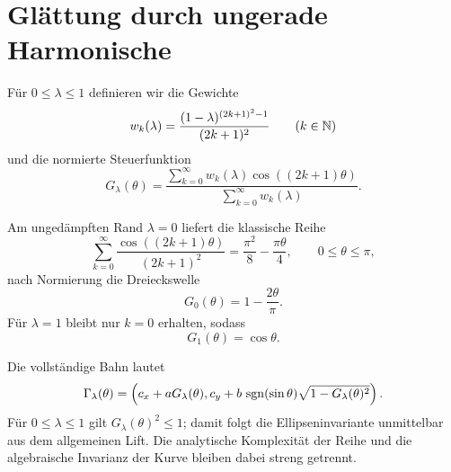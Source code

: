 \section{Glättung durch ungerade Harmonische}

Für $0\leq\lambda\leq1$ definieren wir die Gewichte
\[
  w_k(\lambda)=
  \frac{(1-\lambda)^{(2k+1)^2-1}}{(2k+1)^2}
  \qquad (k\in\mathbb{N})
\]
und die normierte Steuerfunktion
\begin{equation}\label{eq:smooth-control}
  G_\lambda(\theta)=
  \frac{
    \displaystyle\sum_{k=0}^{\infty}
      w_k(\lambda)\cos((2k+1)\theta)
  }{
    \displaystyle\sum_{k=0}^{\infty}w_k(\lambda)
  }.
\end{equation}

Am ungedämpften Rand $\lambda=0$ liefert die klassische Reihe
\[
  \sum_{k=0}^{\infty}
  \frac{\cos((2k+1)\theta)}{(2k+1)^2}
  =\frac{\pi^2}{8}-\frac{\pi\theta}{4},
  \qquad 0\leq\theta\leq\pi,
\]
nach Normierung die Dreieckswelle
\[
  G_0(\theta)=1-\frac{2\theta}{\pi}.
\]
Für $\lambda=1$ bleibt nur $k=0$ erhalten, sodass
\[
  G_1(\theta)=\cos\theta.
\]

Die vollständige Bahn lautet
\begin{equation}\label{eq:smoothed-path}
  \Gamma_\lambda(\theta)=
  \left(
    c_x+aG_\lambda(\theta),
    c_y+b\,\operatorname{sgn}(\sin\theta)
      \sqrt{1-G_\lambda(\theta)^2}
  \right).
\end{equation}
Für $0\leq\lambda\leq1$ gilt $G_\lambda(\theta)^2\leq1$; damit folgt die
Ellipseninvariante unmittelbar aus dem allgemeinen Lift. Die analytische
Komplexität der Reihe und die algebraische Invarianz der Kurve bleiben dabei
streng getrennt.
